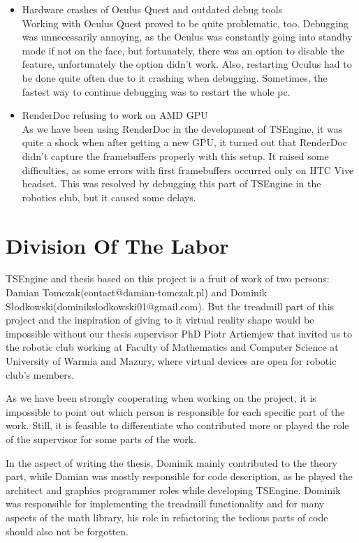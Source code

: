 \begin{itemize}
    \item {Hardware crashes of Oculus Quest and outdated debug tools}\\
    Working with Oculus Quest proved to be quite problematic, too. Debugging was unnecessarily annoying, as the Oculus was constantly going into standby mode if not on the face, but fortunately, there was an option to disable the feature, unfortunately the option didn't work. Also, restarting Oculus had to be done quite often due to it crashing when debugging. Sometimes, the fastest way to continue debugging was to restart the whole pc.
    
    \item {RenderDoc refusing to work on AMD GPU}\\
    As we have been using RenderDoc in the development of TSEngine, it was quite a shock when after getting a new GPU, it turned out that RenderDoc didn't capture the framebuffers properly with this setup. It raised some difficulties, as some errors with first framebuffers occurred only on HTC Vive headset. This was resolved by debugging this part of TSEngine in the robotics club, but it caused some delays.
\end{itemize}

\newpage
\section{Division Of The Labor}
\label{sec:labor}
\hspace{\parindent}
TSEngine and thesis based on this project is a fruit of work of two persons: Damian Tomczak(contact@damian-tomczak.pl) and Dominik Słodkowski(dominikslodkowski01@gmail.com).
But the treadmill part of this project and the inspiration of giving to it virtual reality shape would be impossible without our thesis supervisor PhD Piotr Artiemjew that invited us to the robotic club working at Faculty of Mathematics and Computer Science at University of Warmia and Mazury, where virtual devices are open for robotic club's members.

As we have been strongly cooperating when working on the project, it is impossible to point out which person is responsible for each specific part of the work. Still, it is feasible to differentiate who contributed more or played the role of the supervisor for some parts of the work.

In the aspect of writing the thesis, Dominik mainly contributed to the theory part, while Damian was mostly responsible for code description, as he played the architect and graphics programmer roles while developing TSEngine. Dominik was responsible for implementing the treadmill functionality and for many aspects of the math library, his role in refactoring the tedious parts of code should also not be forgotten.

